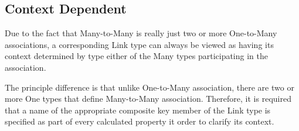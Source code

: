   \subsection{Context Dependent}

  Due to the fact that Many-to-Many is really just two or more One-to-Many associations, a corresponding Link type can always be viewed as having its context determined by type either of the Many types participating in the association.

  The principle difference is that unlike One-to-Many association, there are two or more One types that define Many-to-Many association. Therefore, it is required that a name of the appropriate composite key member of the Link type is specified as part of every calculated property it order to clarify its context.

% 
% 
% 
% 
% 
  